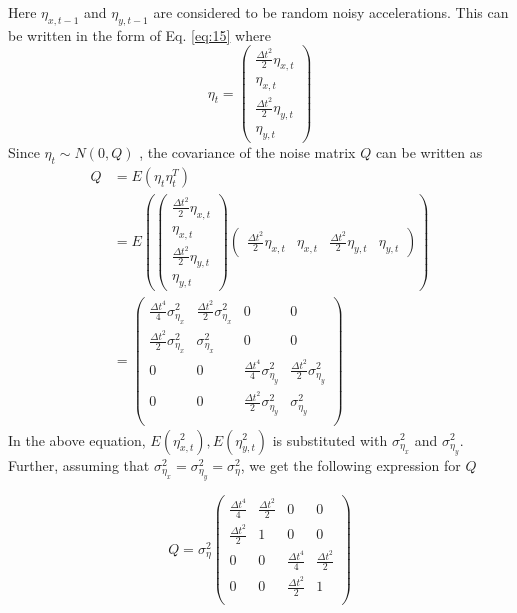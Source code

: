 \documentclass{article}
\begin{document}
Here $\eta_{x,t-1}$ and $\eta_{y,t-1}$ are considered to be random noisy accelerations. This can be written in the form of Eq. \ref{eq:15} where 
$$\eta_t=\begin{pmatrix}
\frac{\Delta t^2}{2}\eta_{x,t} \\
\eta_{x,t} \\
\frac{\Delta t^2}{2}\eta_{y,t}\\
\eta_{y,t}
\end{pmatrix}$$
Since $\eta_t \sim N(0,Q)$ , the covariance of the noise matrix $Q$ can be written as 
\begin{equation}\label{eq:17}
\begin{aligned}
    Q&=E(\eta_t \eta_t^T)\\
    &= E(\begin{pmatrix}
\frac{\Delta t^2}{2}\eta_{x,t} \\
\eta_{x,t} \\
\frac{\Delta t^2}{2}\eta_{y,t}\\
\eta_{y,t}
\end{pmatrix}\begin{pmatrix}\frac{\Delta t^2}{2}\eta_{x,t} & 
\eta_{x,t} &
\frac{\Delta t^2}{2}\eta_{y,t} &
\eta_{y,t}
\end{pmatrix})\\
&=\begin{pmatrix}\frac{\Delta t^4}{4} \sigma_{\eta_x}^2&
\frac{\Delta t^2}{2}\sigma_{\eta_x}^2 & 0 & 0 \\
\frac{\Delta t^2}{2}\sigma_{\eta_x}^2 & \sigma_{\eta_x}^2 & 0 & 0 \\
 0 & 0 & \frac{\Delta t^4}{4} \sigma_{\eta_y}^2 & \frac{\Delta t^2}{2}\sigma_{\eta_y}^2\\
 0 & 0 & \frac{\Delta t^2}{2}\sigma_{\eta_y}^2 & \sigma_{\eta_y}^2 \\
\end{pmatrix}
\end{aligned}
\end{equation}
In the above equation, $E(\eta_{x,t}^2), E(\eta_{y,t}^2)$ is substituted with $\sigma_{\eta_x}^2$ and $\sigma_{\eta_y}^2$. Further, assuming that $\sigma_{\eta_x}^2=\sigma_{\eta_y}^2=\sigma_{\eta}^2$, we get the following expression for $Q$

\begin{equation}\label{eq:18}
    Q=\sigma_\eta^2\begin{pmatrix}
    \frac{\Delta t^4}{4} & \frac{\Delta t^2}{2} & 0 & 0\\
    \frac{\Delta t^2}{2} & 1 & 0 & 0\\
    0 & 0 & \frac{\Delta t^4}{4} & \frac{\Delta t^2}{2} \\
    0 & 0 & \frac{\Delta t^2}{2} & 1 \\
    \end{pmatrix}
\end{equation}
\end{document}
